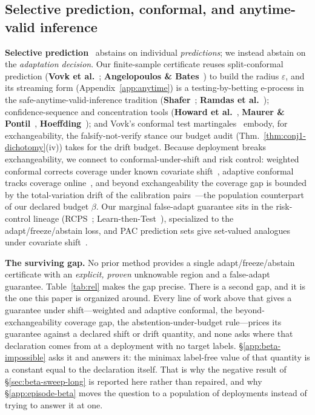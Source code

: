 \documentclass[conference]{IEEEtran}
\theoremstyle{plain}
\theoremstyle{definition}
\begin{document}
\subsection{Selective prediction, conformal, and anytime-valid inference}
\textbf{Selective prediction}~\cite{geifman2017selective} abstains on individual \emph{predictions};
we instead abstain on the \emph{adaptation decision}. Our finite-sample certificate reuses
split-conformal prediction (\textbf{Vovk et al.}~\cite{vovk2005}; \textbf{Angelopoulos \& Bates}~\cite{angelopoulos2023}) to build the
radius $\varepsilon$, and its streaming form (Appendix~\ref{app:anytime}) is a
testing-by-betting e-process in the safe-anytime-valid-inference tradition (\textbf{Shafer}~\cite{shafer2021};
\textbf{Ramdas et al.}~\cite{ramdas2023}); confidence-sequence and concentration tools
(\textbf{Howard et al.}~\cite{howard2021timeuniform}, \textbf{Maurer \& Pontil}~\cite{maurer2009empirical},
\textbf{Hoeffding}~\cite{hoeffding1963probability}); and Vovk's conformal test martingales~\cite{vovk2021martingale}
embody, for exchangeability, the falsify-not-verify stance our budget audit
(Thm.~\ref{thm:conj1-dichotomy}(iv)) takes for the drift budget.
Because deployment breaks exchangeability, we connect to conformal-under-shift and risk control: weighted conformal corrects coverage under known covariate shift~\cite{tibshirani2019conformal}, adaptive conformal tracks coverage online~\cite{gibbs2021adaptive}, and beyond exchangeability the coverage gap is bounded by the total-variation drift of the calibration pairs~\cite{barber2023beyond}---the population counterpart of our declared budget $\beta$. Our marginal false-adapt guarantee sits in the risk-control lineage (RCPS~\cite{bates2021rcps}; Learn-then-Test~\cite{angelopoulos2025ltt}), specialized to the adapt/freeze/abstain loss, and PAC prediction sets give set-valued analogues under covariate shift~\cite{park2022pac}.

\noindent\textbf{The surviving gap.} No prior method provides a single adapt/freeze/abstain
certificate with an \emph{explicit, proven} unknowable region and a false-adapt guarantee.
Table~\ref{tab:rel} makes the gap precise. There is a second gap, and it is the one this paper is
organized around. Every line of work above that gives a guarantee under shift---weighted and
adaptive conformal, the beyond-exchangeability coverage gap, the abstention-under-budget
rule---prices its guarantee against a declared shift or drift quantity, and none asks where that
declaration comes from at a deployment with no target labels. \S\ref{app:beta-impossible} asks it
and answers it: the minimax label-free value of that quantity is a constant equal to the
declaration itself. That is why the negative result of \S\ref{sec:beta-sweep-long} is reported here
rather than repaired, and why \S\ref{app:episode-beta} moves the question to a population of
deployments instead of trying to answer it at one.
\end{document}

